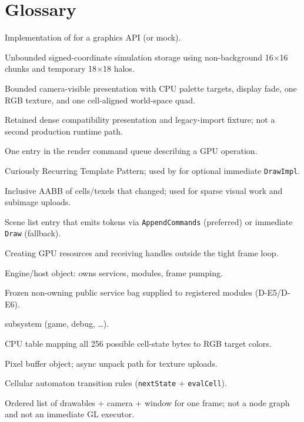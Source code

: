\section{Glossary}
\label{sec:glossary}

\begin{description}[style=nextline, leftmargin=0pt]
  \item[Backend]
    Implementation of  for a graphics API (or mock).
  \item[SparseCellGrid]
    Unbounded signed-coordinate simulation storage using non-background
    16$\times$16 chunks and temporary 18$\times$18 halos.
  \item[CanvasView]
    Bounded camera-visible presentation with CPU palette targets, display fade,
    one RGB texture, and one cell-aligned world-space quad.
  \item[Canvas]
    Retained dense compatibility presentation and legacy-import fixture; not a
    second production runtime path.
  \item[Command / token]
    One entry in the render command queue describing a GPU operation.
  \item[CRTP]
    Curiously Recurring Template Pattern; used by  for
    optional immediate \texttt{DrawImpl}.
  \item[Dirty rect]
    Inclusive AABB of cells/texels that changed; used for sparse visual work
    and subimage uploads.
  \item[Drawable]
    Scene list entry that emits tokens via \texttt{AppendCommands} (preferred)
    or immediate \texttt{Draw} (fallback).
  \item[Enrollment]
    Creating GPU resources and receiving handles outside the tight frame loop.
  \item[Illumo]
    Engine/host object: owns services, modules, frame pumping.
  \item[IllumoContext]
    Frozen non-owning public service bag supplied to registered modules
    (D-E5/D-E6).
  \item[Module]
     subsystem (game, debug, \ldots).
  \item[Palette]
    CPU table mapping all 256 possible cell-state bytes to RGB target colors.
  \item[PBO]
    Pixel buffer object; async unpack path for texture uploads.
  \item[RuleSet]
    Cellular automaton transition rules (\texttt{nextState} + \texttt{evalCell}).
  \item[Scene]
    Ordered list of drawables + camera + window for one frame; not a node graph
    and not an immediate GL executor.
\end{description}

